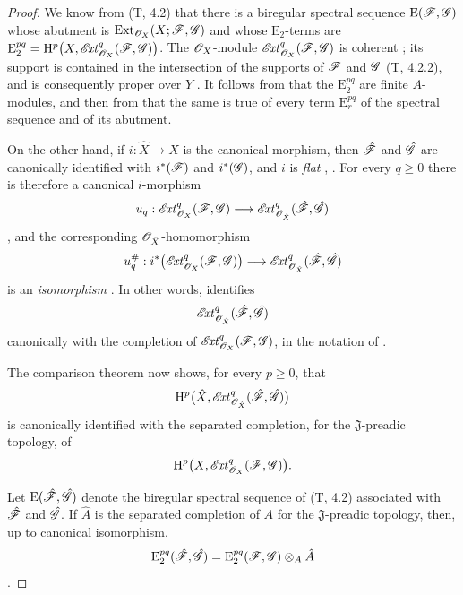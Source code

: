 \begin{proof}
We know from (T, 4.2) that there is a biregular spectral sequence
$\mathrm{E}(\mathscr{F},\mathscr{G})$ whose abutment is $\operatorname{Ext}_{\mathscr{O}_X}(X;\mathscr{F},\mathscr{G})$
and whose $\mathrm{E}_2$-terms are $\mathrm{E}_2^{pq}
=\mathrm{H}^p\bigl(X,\mathscr{E}\!\mathit{xt}^q_{\mathscr{O}_X}(\mathscr{F},\mathscr{G})\bigr)$.
The $\mathscr{O}_X$-module
$\mathscr{E}\!\mathit{xt}^q_{\mathscr{O}_X}(\mathscr{F},\mathscr{G})$ is coherent
; its support is contained in the intersection of
the supports of $\mathscr{F}$ and $\mathscr{G}$ (T, 4.2.2), and is consequently
proper over $Y$ .  It follows from
 that the $\mathrm{E}_2^{pq}$ are finite
$A$-modules, and then from  that the same is true
of every term $\mathrm{E}_r^{pq}$ of the spectral sequence and of
its abutment.

On the other hand, if $i:\hat{X}\to X$ is the canonical morphism,
then $\hat{\mathscr{F}}$ and $\hat{\mathscr{G}}$ are canonically identified
with $i^*(\mathscr{F})$ and $i^*(\mathscr{G})$, and $i$ is \emph{flat}
, .  For every $q\geq0$ there
is therefore a canonical $i$-morphism
\[
  u_q:\mathscr{E}\!\mathit{xt}^q_{\mathscr{O}_X}(\mathscr{F},\mathscr{G})
  \longrightarrow
  \mathscr{E}\!\mathit{xt}^q_{\mathscr{O}_{\hat{X}}}
    (\hat{\mathscr{F}},\hat{\mathscr{G}})
\]
, and the corresponding
$\mathscr{O}_{\hat{X}}$-homomorphism
\[
  u_q^\#:
  i^*\bigl(\mathscr{E}\!\mathit{xt}^q_{\mathscr{O}_X}(\mathscr{F},\mathscr{G})\bigr)
  \longrightarrow
  \mathscr{E}\!\mathit{xt}^q_{\mathscr{O}_{\hat{X}}}
    (\hat{\mathscr{F}},\hat{\mathscr{G}})
\]
is an \emph{isomorphism} .  In other words,
 identifies
\[
  \mathscr{E}\!\mathit{xt}^q_{\mathscr{O}_{\hat{X}}}
    (\hat{\mathscr{F}},\hat{\mathscr{G}})
\]
canonically with the completion of
$\mathscr{E}\!\mathit{xt}^q_{\mathscr{O}_X}(\mathscr{F},\mathscr{G})$, in the notation of
.

The comparison theorem  now shows, for every
$p\geq0$, that
\[
  \mathrm{H}^p\bigl(\hat{X},
    \mathscr{E}\!\mathit{xt}^q_{\mathscr{O}_{\hat{X}}}
      (\hat{\mathscr{F}},\hat{\mathscr{G}})\bigr)
\]
is canonically identified with the separated completion, for the
$\mathfrak J$-preadic topology, of
\[
  \mathrm{H}^p\bigl(X,\mathscr{E}\!\mathit{xt}^q_{\mathscr{O}_X}(\mathscr{F},\mathscr{G})\bigr).
\]


Let $\mathrm{E}(\hat{\mathscr{F}},\hat{\mathscr{G}})$ denote the biregular
spectral sequence of (T, 4.2) associated with $\hat{\mathscr{F}}$ and
$\hat{\mathscr{G}}$.  If $\hat{A}$ is the separated completion of $A$ for
the $\mathfrak J$-preadic topology, then, up to canonical
isomorphism,
\[
  \mathrm{E}_2^{pq}(\hat{\mathscr{F}},\hat{\mathscr{G}})
  =
  \mathrm{E}_2^{pq}(\mathscr{F},\mathscr{G})\otimes_A\hat{A}
\]
.


\end{proof}
